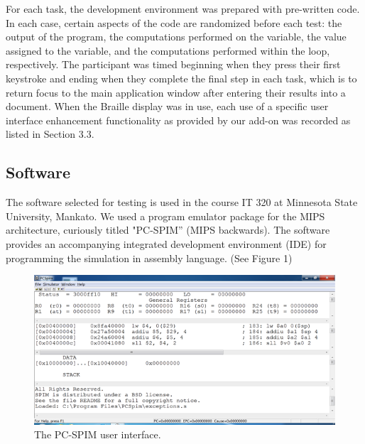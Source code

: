 \documentclass[11.5pt]{sig-alternate} %
\begin{document}
\begin{large}
For each task, the development environment was prepared with pre-written code. In each case, certain aspects of the code are randomized before each test: the output of the program, the computations performed on the variable, the value assigned to the variable, and the computations performed within the loop, respectively. The participant was timed beginning when they press their first keystroke and ending when they complete the final step in each task, which is to return focus to the main application window after entering their results into a document.
When the Braille display was in use, each use of a specific user interface enhancement functionality as provided by our add-on was recorded as listed in Section 3.3.

\subsection*{Software}

The software selected for testing is used in the course IT 320 at Minnesota State University, Mankato. We used a program emulator package for the MIPS architecture, curiously titled "PC-SPIM” (MIPS backwards). The software provides an accompanying integrated development environment (IDE) for programming the simulation in assembly language. (See Figure 1) 

\begin{figure}[!h]
    \centering
    \includegraphics[width=1\linewidth]{images/fig1.png}
    \caption{The PC-SPIM user interface.}
\end{figure}


\end{large}
\end{document}
